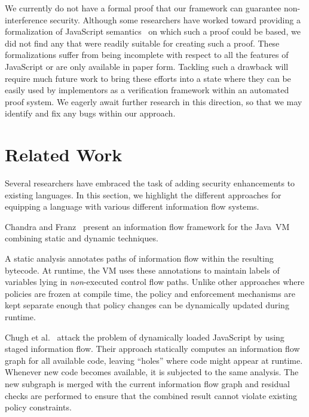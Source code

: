 We currently do not have a formal proof that our framework can guarantee non-interference security.
Although some researchers have worked toward providing a formalization of JavaScript semantics~\cite{yu2007javascript, herman2007status, maffeis2008operational, guha2010essence} on which such a proof could be based, we did not find any that were readily suitable for creating such a proof.
These formalizations suffer from being incomplete with respect to all the features of JavaScript or are only available in paper form.
Tackling such a drawback will require much future work to bring these efforts into a state where they can be easily used by implementors as a verification framework within an automated proof system.
We eagerly await further research in this direction, so that we may identify and fix any bugs within our approach.




\section{Related Work}
\label{sec:relatedwork}

Several researchers have embraced the task of adding security enhancements to existing languages.
In this section, we highlight the different approaches for equipping a language with various different information flow systems.

Chandra and Franz~\cite{10.1109/ACSAC.2007.37} present an information flow framework for the Java~VM combining static and dynamic techniques.

A static analysis annotates paths of information flow within the resulting bytecode.
At runtime, the VM uses these annotations to maintain labels of variables lying in \emph{non}-executed control flow paths.
Unlike other approaches where policies are frozen at compile time, the policy and enforcement mechanisms are kept separate enough that policy changes can be dynamically updated during runtime.

Chugh et al.~\cite{1542483} attack the problem of dynamically loaded JavaScript by using staged information flow.
Their approach statically computes an information flow graph for all available code, leaving ``holes'' where code might appear at runtime.
Whenever new code becomes available, it is subjected to the same analysis.
The new subgraph is merged with the current information flow graph and residual checks are performed to ensure that the combined result cannot violate existing policy constraints.

